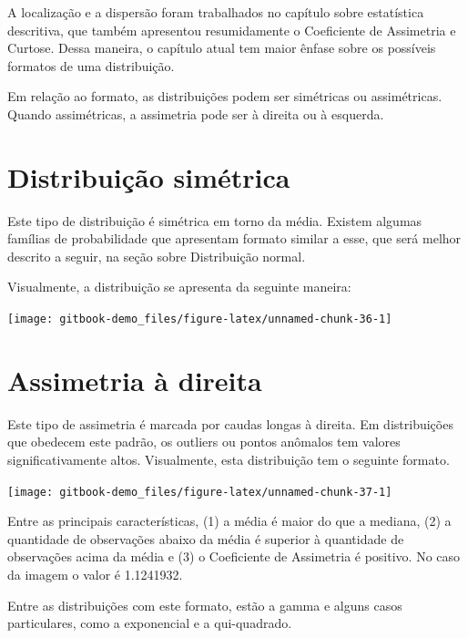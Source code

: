 \documentclass[
]{book}
\begin{document}
A localização e a dispersão foram trabalhados no capítulo sobre estatística descritiva, que também apresentou resumidamente o Coeficiente de Assimetria e Curtose. Dessa maneira, o capítulo atual tem maior ênfase sobre os possíveis formatos de uma distribuição.

Em relação ao formato, as distribuições podem ser simétricas ou assimétricas. Quando assimétricas, a assimetria pode ser à direita ou à esquerda.

\hypertarget{distribuiuxe7uxe3o-simuxe9trica}{%
\section{Distribuição simétrica}\label{distribuiuxe7uxe3o-simuxe9trica}}

Este tipo de distribuição é simétrica em torno da média. Existem algumas famílias de probabilidade que apresentam formato similar a esse, que será melhor descrito a seguir, na seção sobre Distribuição normal.

Visualmente, a distribuição se apresenta da seguinte maneira:

\begin{center}\texttt{[image: gitbook-demo\_files/figure-latex/unnamed-chunk-36-1]} \end{center}

\hypertarget{assimetria-uxe0-direita}{%
\section{Assimetria à direita}\label{assimetria-uxe0-direita}}

Este tipo de assimetria é marcada por caudas longas à direita. Em distribuições que obedecem este padrão, os outliers ou pontos anômalos tem valores significativamente altos. Visualmente, esta distribuição tem o seguinte formato.

\begin{center}\texttt{[image: gitbook-demo\_files/figure-latex/unnamed-chunk-37-1]} \end{center}

Entre as principais características, (1) a média é maior do que a mediana, (2) a quantidade de observações abaixo da média é superior à quantidade de observações acima da média e (3) o Coeficiente de Assimetria é positivo. No caso da imagem o valor é 1.1241932.

Entre as distribuições com este formato, estão a gamma e alguns casos particulares, como a exponencial e a qui-quadrado.
\end{document}
